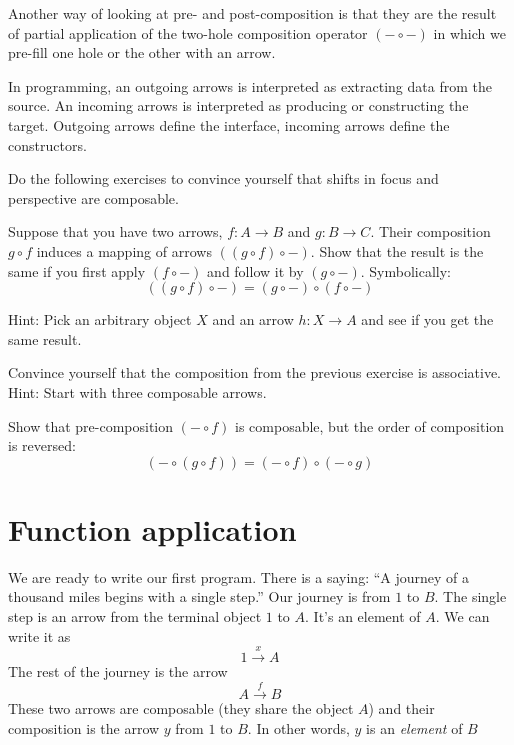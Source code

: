 \documentclass[DaoFP]{subfiles}
\begin{document}
Another way of looking at pre- and post-composition is that they are the result of partial application of the two-hole composition operator $(- \circ -)$ in which we pre-fill one hole or the other with an arrow.

In programming, an outgoing arrows is interpreted as extracting data from the source. An incoming arrows is interpreted as producing or constructing the target. Outgoing arrows define the interface, incoming arrows define the constructors.

Do the following exercises to convince yourself that shifts in focus and perspective are composable.
\begin{exercise}\label{ex-yoneda-composition}
Suppose that you have two arrows, $f \colon A \to B$ and $g \colon B \to C$. Their composition $g \circ f$ induces a mapping of arrows $((g \circ f) \circ -)$. Show that the result is the same if you first apply $(f \circ -)$ and follow it by $(g \circ -)$. Symbolically:
\[((g \circ f) \circ -) = (g \circ -) \circ (f \circ -)\]

Hint: Pick an arbitrary object $X$ and an arrow $h \colon X \to A$ and see if you get the same result. 
\end{exercise}

\begin{exercise}
Convince yourself that the composition from the previous exercise is associative. Hint: Start with three composable arrows.
\end{exercise}

\begin{exercise}
Show that pre-composition $(- \circ f)$ is composable, but the order of composition is reversed:
\[(- \circ (g \circ f)) = (- \circ f) \circ (- \circ g) \]
\end{exercise}

\section{Function application}

We are ready to write our first program. There is a saying: ``A journey of a thousand miles begins with a single step.'' Our journey is from $1$ to $B$. The single step is an arrow from the terminal object $1$ to $A$. It's an element of $A$. We can write it as
\[1 \xrightarrow x A \]
The rest of the journey is the arrow 
\[A \xrightarrow f B\]
These two arrows are composable (they share the object $A$) and their composition is the arrow $y$ from $1$ to $B$. In other words, $y$ is an \emph{element} of $B$
\end{document}
